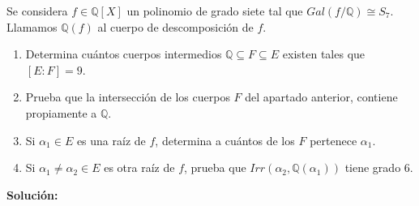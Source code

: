 \begin{exercise}
Se considera $f \in \mathbb{Q}[X]$ un polinomio de grado siete tal que $Gal(f/\mathbb{Q}) \cong S_7$. Llamamos $\mathbb{Q}(f)$ al cuerpo de descomposición de $f$. 

\begin{enumerate}
\item Determina cuántos cuerpos intermedios $\mathbb{Q} \subseteq F \subseteq E$ existen tales que $[E:F] = 9$.
\item Prueba que la intersección de los cuerpos $F$ del apartado anterior, contiene propiamente a $\mathbb{Q}$.
\item Si $\alpha_1 \in E$ es una raíz de $f$, determina a cuántos de los $F$ pertenece $\alpha_1$.
\item Si $\alpha_1 \neq \alpha_2 \in E$ es otra raíz de $f$, prueba que $Irr(\alpha_2,\mathbb{Q}(\alpha_1))$ tiene grado 6. 
\end{enumerate}
\end{exercise}

\textbf{Solución:}

